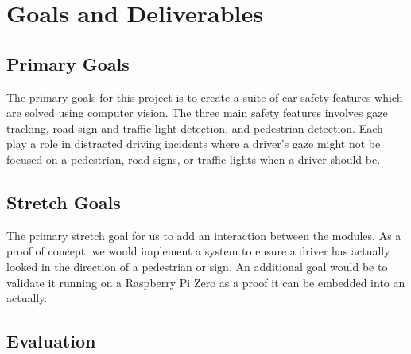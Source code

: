 \section{Goals and Deliverables}

\subsection{Primary Goals}

The primary goals for this project is to create a suite of car safety features which are solved using computer vision.
The three main safety features involves gaze tracking, road sign and traffic light detection, and pedestrian detection.
Each play a role in distracted driving incidents where a driver's gaze might not be focused on a pedestrian, road signs, or traffic lights when a driver should be.

\subsection{Stretch Goals}

The primary stretch goal for us to add an interaction between the modules.
As a proof of concept, we would implement a system to ensure a driver has actually looked in the direction of a pedestrian or sign.
An additional goal would be to validate it running on a Raspberry Pi Zero as a proof it can be embedded into an actually.

\subsection{Evaluation}

